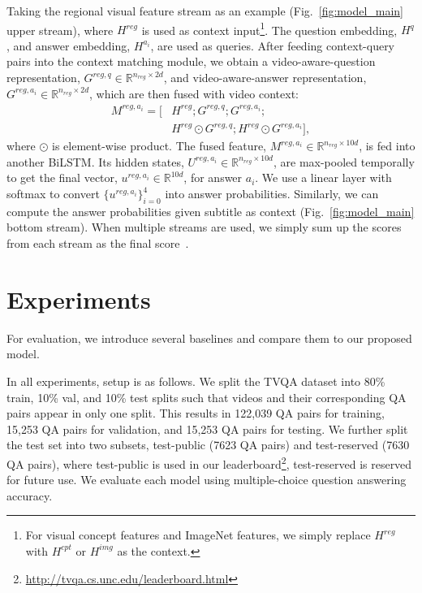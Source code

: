 \documentclass[11pt,a4paper]{article}
\begin{document}
Taking the regional visual feature stream as an example (Fig.~\ref{fig:model_main} upper stream), where $H^{reg}$ is used as context input\footnote{For visual concept features and ImageNet features, we simply replace $H^{reg}$ with $H^{cpt}$ or $H^{img}$ as the context.}.
The question embedding, $H^{q}$, and answer embedding, $H^{a_i}$, are used as  queries. 
After feeding context-query pairs into the context matching module, we obtain a video-aware-question representation, $G^{reg,q} \in \mathbb{R}^{n_{reg} \times 2d}$, and video-aware-answer representation, $G^{reg,a_i} \in \mathbb{R}^{n_{reg} \times 2d}$, which are then fused with video context:
\begin{align*}
    M^{reg,a_i} = [&H^{reg}; G^{reg,q}; G^{reg,a_i}; \\
               &H^{reg} \odot G^{reg,q}; H^{reg} \odot G^{reg,a_i}],
\end{align*}
where $\odot$ is element-wise product.
The fused feature, $M^{reg,a_i} \in \mathbb{R}^{n_{reg} \times 10d}$, is fed into another BiLSTM.
Its hidden states, $U^{reg,a_i} \in \mathbb{R}^{n_{reg} \times 10d}$, are max-pooled temporally to get the final vector, $u^{reg,a_i} \in \mathbb{R}^{10d}$, for answer $a_i$.
We use a linear layer with softmax to convert $\{{u^{reg,a_i}}\}_{i=0}^4$ into answer probabilities.
Similarly, we can compute the answer probabilities given subtitle as context (Fig.~\ref{fig:model_main} bottom stream).
When multiple streams are used, we simply sum up the scores from each stream as the final score~\citep{Wang2016TemporalSN}.

 \section{Experiments} \label{sec:experiments}

For evaluation, we introduce several baselines and compare them to our proposed model.  

In all experiments, setup is as follows.
We split the TVQA dataset into 80\% train, 10\% val, and 10\% test splits such that videos and their corresponding QA pairs appear in only one split. This results in 122,039 QA pairs for training, 15,253 QA pairs for validation, and 15,253 QA pairs for testing. We further split the test set into two subsets, test-public (7623 QA pairs) and test-reserved (7630 QA pairs), where test-public is used in our leaderboard\footnote{\url{http://tvqa.cs.unc.edu/leaderboard.html}}, test-reserved is reserved for future use. We evaluate each model using multiple-choice question answering accuracy.
\end{document}
